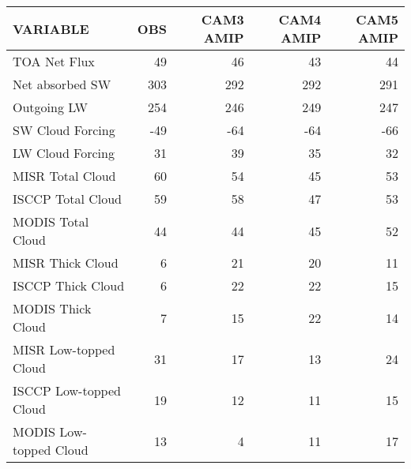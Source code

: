 \begin{tabular}{lrrrr}
\hline
                VARIABLE &                      OBS &                CAM3 AMIP &                CAM4 AMIP &                CAM5 AMIP \\ \hline
            TOA Net Flux &                       49 &                       46 &                       43 &                       44 \\
         Net absorbed SW &                      303 &                      292 &                      292 &                      291 \\
             Outgoing LW &                      254 &                      246 &                      249 &                      247 \\
        SW Cloud Forcing &                      -49 &                      -64 &                      -64 &                      -66 \\
        LW Cloud Forcing &                       31 &                       39 &                       35 &                       32 \\
        MISR Total Cloud &                       60 &                       54 &                       45 &                       53 \\
       ISCCP Total Cloud &                       59 &                       58 &                       47 &                       53 \\
       MODIS Total Cloud &                       44 &                       44 &                       45 &                       52 \\
        MISR Thick Cloud &                        6 &                       21 &                       20 &                       11 \\
       ISCCP Thick Cloud &                        6 &                       22 &                       22 &                       15 \\
       MODIS Thick Cloud &                        7 &                       15 &                       22 &                       14 \\
   MISR Low-topped Cloud &                       31 &                       17 &                       13 &                       24 \\
  ISCCP Low-topped Cloud &                       19 &                       12 &                       11 &                       15 \\
  MODIS Low-topped Cloud &                       13 &                        4 &                       11 &                       17 \\

\end{tabular}
